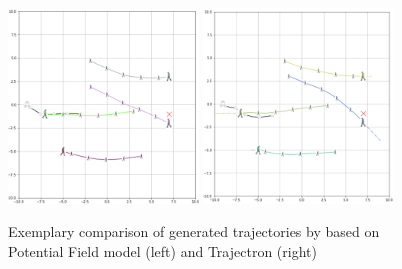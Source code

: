 \begin{figure}[!ht]
\begin{center}
\includegraphics[width=0.45\textwidth]{images/show_case_ipopt.png}
\includegraphics[width=0.45\textwidth]{images/impact_env_trajectron.png}
\end{center}
\caption{Exemplary comparison of generated trajectories by based on Potential Field model (left) and Trajectron \cite{Ivanovic2018} (right)}
\label{img:effect_pred}
\end{figure}
